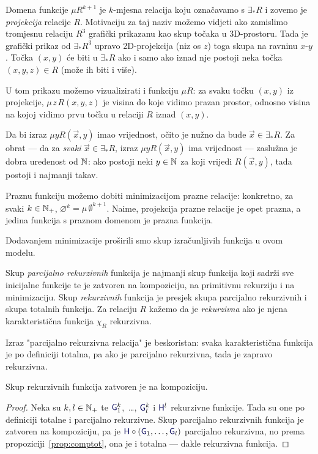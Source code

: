 Domena funkcije $\mu R^{k+1}$ je $k$-mjesna relacija koju označavamo s $\exists_*R$ i zovemo je \emph{projekcija} relacije $R$. Motivaciju za taj naziv možemo vidjeti ako zamislimo tromjesnu relaciju $R^3$ grafički prikazanu kao skup točaka u 3D-prostoru. Tada je grafički prikaz od $\exists_*R^3$ upravo 2D-projekcija (niz os $z$) toga skupa na ravninu $x$-$y$. Točka $(x,y)$ će biti u $\exists_*R$ ako i samo ako iznad nje postoji neka točka $(x,y,z)\in R$ (može ih biti i više).

U tom prikazu možemo vizualizirati i funkciju $\mu R$: za svaku točku $(x,y)$ iz projekcije, $\mu\mspace{2mu}z\mspace{2mu}R(x,y,z)$ je visina do koje vidimo prazan prostor, odnosno visina na kojoj vidimo prvu točku u relaciji $R$ iznad $(x,y)$. 

Da bi izraz $\mu yR(\vec x,y)$ imao vrijednost, očito je nužno da bude $\vec x\in\exists_*R$. Za obrat --- da za \emph{svaki} $\vec x\in\exists_*R$, izraz $\mu yR(\vec x,y)$ ima vrijednost --- zaslužna je dobra uređenost od ${\mathbb N}$: ako postoji neki $y\in{\mathbb N}$ za koji vrijedi $R(\vec x,y)$, tada postoji i najmanji takav\!.

\begin{primjer}[{name=[prazna funkcija minimizacijom]}]\label{pr:varnothingprek}
Praznu funkciju možemo dobiti minimizacijom prazne relacije: konkretno, za svaki $k\in{\mathbb N}_+$, $\varnothing^k=\mu\,\emptyset^{k+1}$. Naime, projekcija prazne relacije je opet prazna, a jedina funkcija s praznom domenom je prazna funkcija.
\end{primjer}

Dodavanjem minimizacije proširili smo skup izračunljivih funkcija u ovom modelu.

\begin{definicija}[{name=[(parcijalno) rekurzivne funkcije i relacije]}]\label{def:parcrek}
Skup \emph{parcijalno rekurzivnih} funkcija je najmanji skup funkcija koji sadrži sve inicijalne funkcije te je zatvoren na kompoziciju, na primitivnu rekurziju i na minimizaciju. Skup \emph{rekurzivnih} funkcija je presjek skupa parcijalno rekurzivnih i skupa totalnih funkcija. Za relaciju $R$ kažemo da je \emph{rekurzivna} ako je njena karakteristična funkcija $\chi_R$ rekurzivna.
\end{definicija}

Izraz "parcijalno rekurzivna relacija" je beskoristan: svaka karakteristična funkcija je po definiciji totalna, pa ako je parcijalno rekurzivna, tada je zapravo rekurzivna.

\begin{lema}[{name=[zatvorenost skupa rekurzivnih funkcija na kompoziciju]}]\label{lm:comprek}
Skup rekurzivnih funkcija zatvoren je na kompoziciju.
\end{lema}
\begin{proof}
Neka su $k,l\in{\mathbb N}_+$ te $\f G_1^k$,~\ldots, $\f G_l^k$ i $\f H^l$ rekurzivne funkcije. Tada su one po definiciji totalne i parcijalno rekurzivne. Skup parcijalno rekurzivnih funkcija je zatvoren na kompoziciju, pa je $\f H\circ(\f G_1,\dotsc,\f G_l)$ parcijalno rekurzivna, no prema propoziciji~\ref{prop:comptot}, ona je i totalna --- dakle rekurzivna funkcija.
\end{proof}

